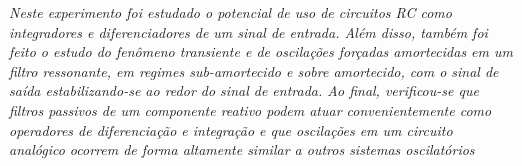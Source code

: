\textit{Neste experimento foi estudado o potencial de uso de circuitos RC como integradores e diferenciadores de um sinal de entrada. Além disso, também foi feito o estudo do fenômeno transiente e de oscilações forçadas amortecidas em um filtro ressonante, em regimes sub-amortecido e sobre amortecido, com o sinal de saída estabilizando-se ao redor do sinal de entrada. Ao final, verificou-se que filtros passivos de um componente reativo podem atuar convenientemente como operadores de diferenciação e integração e que oscilações em um circuito analógico ocorrem de forma altamente similar a outros sistemas oscilatórios}